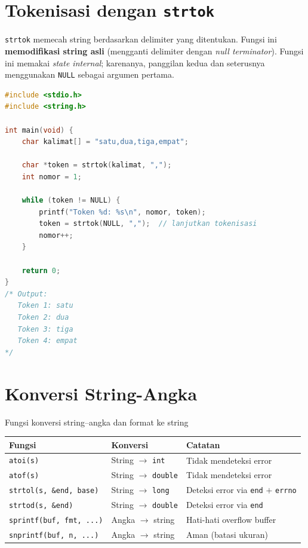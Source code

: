 \documentclass[../main.tex]{subfiles}
\begin{document}
\section{Tokenisasi dengan \texttt{strtok}}

\texttt{strtok} memecah string berdasarkan delimiter yang ditentukan. Fungsi ini \textbf{memodifikasi string asli} (mengganti delimiter dengan \textit{null terminator}). Fungsi ini memakai \textit{state internal}; karenanya, panggilan kedua dan seterusnya menggunakan \texttt{NULL} sebagai argumen pertama.

\begin{lstlisting}[language=C,caption=Tokenisasi string]
#include <stdio.h>
#include <string.h>

int main(void) {
    char kalimat[] = "satu,dua,tiga,empat";
    
    char *token = strtok(kalimat, ",");
    int nomor = 1;
    
    while (token != NULL) {
        printf("Token %d: %s\n", nomor, token);
        token = strtok(NULL, ",");  // lanjutkan tokenisasi
        nomor++;
    }
    
    return 0;
}
/* Output:
   Token 1: satu
   Token 2: dua
   Token 3: tiga
   Token 4: empat
*/
\end{lstlisting}

\section{Konversi String-Angka}

\begin{modultable}[]{Fungsi konversi string--angka dan format ke string}
\begin{tabular}{|l|l|p{6cm}|}
\hline
\textbf{Fungsi} & \textbf{Konversi} & \textbf{Catatan} \\
\hline
\texttt{atoi(s)} & String $\rightarrow$ \texttt{int} & Tidak mendeteksi error \\
\hline
\texttt{atof(s)} & String $\rightarrow$ \texttt{double} & Tidak mendeteksi error \\
\hline
\texttt{strtol(s, \&end, base)} & String $\rightarrow$ \texttt{long} & Deteksi error via \texttt{end} $+$ \texttt{errno} \\
\hline
\texttt{strtod(s, \&end)} & String $\rightarrow$ \texttt{double} & Deteksi error via \texttt{end} \\
\hline
\texttt{sprintf(buf, fmt, ...)} & Angka $\rightarrow$ string & Hati-hati overflow buffer \\
\hline
\texttt{snprintf(buf, n, ...)} & Angka $\rightarrow$ string & Aman (batasi ukuran) \\
\hline
\end{tabular}
\end{modultable}
\end{document}
